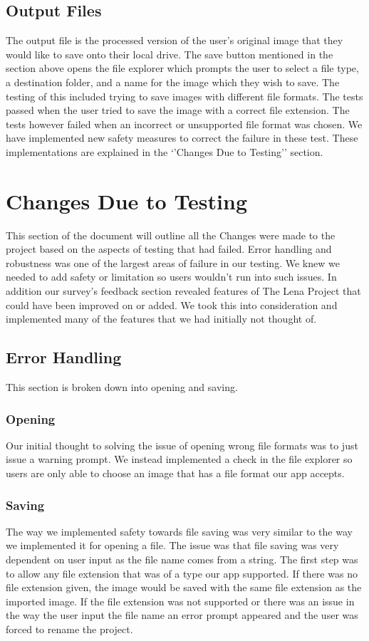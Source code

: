 \documentclass[12pt, titlepage]{article}
\begin{document}
\subsection{Output Files}
The output file is the processed version of the user’s original image that they would like to save onto their local drive. The save button mentioned in the section above opens the file explorer which prompts the user to select a file type, a destination folder, and a name for the image which they wish to save. The testing of this included trying to save images with different file formats. The tests passed when the user tried to save the image with a correct file extension. The tests however failed when an incorrect or unsupported file format was chosen. We have implemented new safety measures to correct the failure in these test. These implementations are explained in the ‘’Changes Due to Testing’’ section. 

\section{Changes Due to Testing}
This section of the document will outline all the Changes were made to the project based on the aspects of testing that had failed. Error handling and robustness was one of the largest areas of failure in our testing. We knew we needed to add safety or limitation so users wouldn’t run into such issues. In addition our survey’s feedback section revealed features of The Lena Project that could have been improved on or added. We took this into consideration and implemented many of the features that we had initially not thought of.

\subsection{Error Handling}
This section is broken down into opening and saving.

\subsubsection{Opening}
Our initial thought to solving the issue of opening wrong file formats was to just issue a warning prompt. We instead implemented a check in the file explorer so users are only able to choose an image that has a file format our app accepts.

\subsubsection{Saving}
The way we implemented safety towards file saving was very similar to the way we implemented it for opening a file. The issue was that file saving was very dependent on user input as the file name comes from a string. The first step was to allow any file extension that was of a type our app supported. If there was no file extension given, the image would be saved with the same file extension as the imported image. If the file extension was not supported or there was an issue in the way the user input the file name an error prompt appeared and the user was forced to rename the project.
\end{document}
